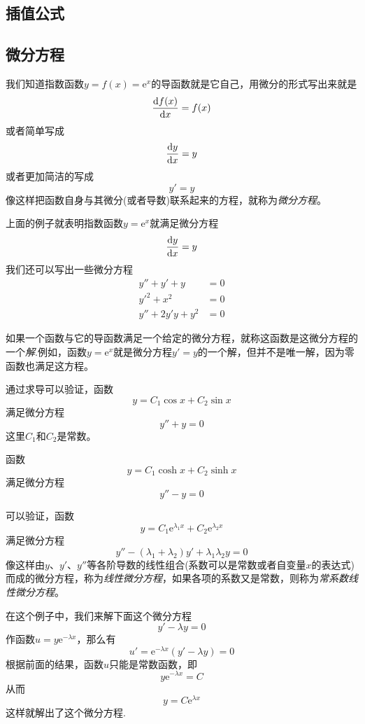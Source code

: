 \subsection{插值公式}
\label{sec:interpolation-formula}


\subsection{微分方程}
\label{sec:differtial-equation}

我们知道指数函数$y=f(x)=\mathrm{e}^x$的导函数就是它自己，用微分的形式写出来就是
\[ \frac{\mathop{}\!\mathrm{d} f(x)}{\mathop{}\!\mathrm{d} x} = f(x) \]
或者简单写成
\[ \frac{\mathop{}\!\mathrm{d} y}{\mathop{}\!\mathrm{d} x} = y \]
或者更加简洁的写成
\[ y'=y \]
像这样把函数自身与其微分(或者导数)联系起来的方程，就称为\emph{微分方程}。

上面的例子就表明指数函数$y=\mathrm{e}^x$就满足微分方程
\[ \frac{\mathop{}\!\mathrm{d} y}{\mathop{}\!\mathrm{d} x} = y \]
我们还可以写出一些微分方程
\begin{align*}
  y''+y'+y&=0 \\
  y'^2+x^2&=0 \\
  y''+2y'y+y^2& = 0
\end{align*}

如果一个函数与它的导函数满足一个给定的微分方程，就称这函数是这微分方程的一个\emph{解}.例如，函数$y=\mathrm{e}^x$就是微分方程$y'=y$的一个解，但并不是唯一解，因为零函数也满足这方程。

\begin{example}
  通过求导可以验证，函数
  \[ y=C_1 \cos{x} + C_2 \sin{x} \]
  满足微分方程
  \[ y''+y=0 \]
  这里$C_1$和$C_2$是常数。
\end{example}

\begin{example}
  函数
  \[ y= C_1 \cosh{x} + C_2 \sinh{x} \]
  满足微分方程
  \[ y''-y=0 \]
\end{example}

\begin{example}
  可以验证，函数
  \[ y = C_1 \mathrm{e}^{\lambda_1 x} + C_2 \mathrm{e}^{\lambda_2 x} \]
  满足微分方程
  \[ y''-(\lambda_1+\lambda_2)y' + \lambda_1 \lambda_2 y = 0 \]
  像这样由$y$、$y'$、$y''$等各阶导数的线性组合(系数可以是常数或者自变量$x$的表达式)而成的微分方程，称为\emph{线性微分方程}，如果各项的系数又是常数，则称为\emph{常系数线性微分方程}。
\end{example}

\begin{example}
  在这个例子中，我们来解下面这个微分方程
  \[ y'-\lambda y = 0 \]
  作函数$u=y\mathrm{e}^{-\lambda x}$，那么有
  \[ u'=\mathrm{e}^{-\lambda x} (y'-\lambda y) = 0 \]
  根据前面的结果，函数$u$只能是常数函数，即
  \[ y\mathrm{e}^{-\lambda x} = C \]
  从而
  \[ y = C \mathrm{e}^{\lambda x} \]
  这样就解出了这个微分方程.
\end{example}




